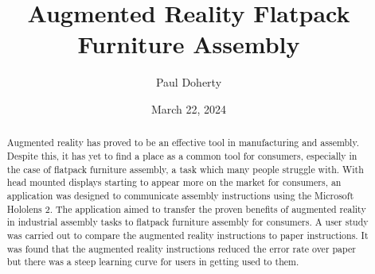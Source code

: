 \documentclass{l4proj}
\begin{document}
\title{Augmented Reality Flatpack Furniture Assembly}
\author{Paul Doherty}
\date{March 22, 2024}

\maketitle

\begin{abstract}
    Augmented reality has proved to be an effective tool in manufacturing and assembly. Despite this, it has yet to find a place as a common tool for consumers, especially in the case of flatpack furniture assembly, a task which many people struggle with. With head mounted displays starting to appear more on the market for consumers, an application was designed to communicate assembly instructions using the Microsoft Hololens 2. The application aimed to transfer the proven benefits of augmented reality in industrial assembly tasks to flatpack furniture assembly for consumers. A user study was carried out to compare the augmented reality instructions to paper instructions. It was found that the augmented reality instructions reduced the error rate over paper but there was a steep learning curve for users in getting used to them.
\end{abstract}


%
%
%

\def\consentname {Paul Kieran Doherty} %
\def\consentdate {13 February 2024} %

\educationalconsent

\tableofcontents
\end{document}
